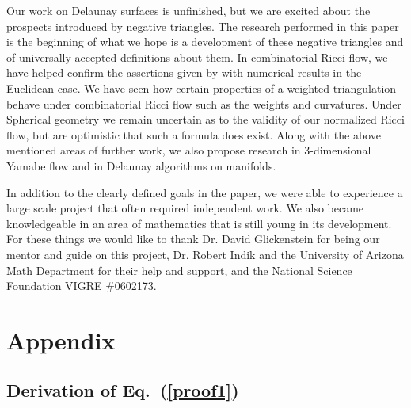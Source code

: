 \documentclass[12pt]{article}
\begin{document}
\noindent Our work on Delaunay surfaces is unfinished, but we are excited about the prospects introduced by negative triangles. The research performed in this paper is the beginning of what we hope is a development of these negative triangles and of universally accepted definitions about them. In combinatorial Ricci flow, we have helped confirm the assertions given by \cite{chowluo} with numerical results in the Euclidean case. We have seen how certain properties of a weighted triangulation behave under combinatorial Ricci flow such as the weights and curvatures. Under Spherical geometry we remain uncertain as to the validity of our normalized Ricci flow, but are optimistic that such a formula does exist. Along with the above mentioned areas of further work, we also propose research in 3-dimensional Yamabe flow and in Delaunay algorithms on manifolds.\newline

\noindent In addition to the clearly defined goals in the paper, we were able to experience a large scale project that often required independent work. We also became knowledgeable in an area of mathematics that is still young in its development. For these things we would like to thank Dr. David Glickenstein for being our mentor and guide on this project, Dr. Robert Indik and the University of Arizona Math Department for their help and support, and the National Science Foundation VIGRE $\#$0602173.



\newpage
\section{Appendix}

\subsection{Derivation of Eq.~(\ref{proof1})}
\maketitle
	
\end{document}
